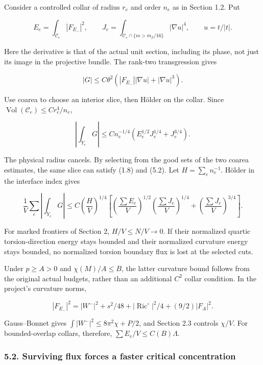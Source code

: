 \documentclass[
  10pt,
]{article}
\begin{document}
Consider a controlled collar of radius \(r_e\) and order \(n_e\) as in
Section 1.2. Put

\[
 E_e=\int_{\mathcal C_e}|F_{E_-}|^2,\qquad
 J_e=\int_{\mathcal C_e\cap\{m>m_\beta/16\}}|\nabla u|^4,
 \qquad u=t/|t|.
\]

Here the derivative is that of the actual unit section, including its
phase, not just its image in the projective bundle. The rank-two
transgression gives

\[
 |G|\le C\theta^2(|F_{E_-}||\nabla u|+|\nabla u|^3).
\]

Use coarea to choose an interior slice, then Hölder on the collar. Since
\(\operatorname{Vol}(\mathcal C_e)\le Cr_e^4/n_e\),

\[
 \boxed{\left|\int_{Y_e}G\right|
 \le C n_e^{-1/4}
                  (E_e^{1/2}J_e^{1/4}+J_e^{3/4}).}
 \tag{5.2}
\]

The physical radius cancels. By selecting from the good sets of the two
coarea estimates, the same slice can satisfy (1.8) and (5.2). Let
\(H=\sum_e n_e^{-1}\). Hölder in the interface index gives

\[
 \boxed{\frac1V\sum_e\left|\int_{Y_e}G\right|
 \le C\left(\frac HV\right)^{1/4}
 \left[
   \left(\frac{\sum E_e}V\right)^{1/2}
   \left(\frac{\sum J_e}V\right)^{1/4}
       +\left(\frac{\sum J_e}V\right)^{3/4}
 \right].}
 \tag{5.3}
\]

For marked frontiers of Section 2, \(H/V\le N/V\to0\). If their
normalized quartic torsion-direction energy stays bounded and their
normalized curvature energy stays bounded, no normalized torsion
boundary flux is lost at the selected cuts.

Under \(p\ge A>0\) and \(\chi(M)/A\le B\), the latter curvature bound
follows from the original actual budgets, rather than an additional
\(C^2\) collar condition. In the project's curvature norms,

\[
 |F_{E_-}|^2=|W^-|^2+s^2/48
                +|\operatorname{Ric}^{\circ}|^2/4+(9/2)|F_A|^2.
\]

Gauss--Bonnet gives \(\int|W^-|^2\le8\pi^2\chi+P/2\), and Section 2.3
controls \(\chi/V\). For bounded-overlap collars, therefore,
\(\sum E_e/V\le C(B)\Lambda\).

\hypertarget{surviving-flux-forces-a-faster-critical-concentration}{%
\subsubsection{5.2. Surviving flux forces a faster critical
concentration}\label{surviving-flux-forces-a-faster-critical-concentration}}
\end{document}
